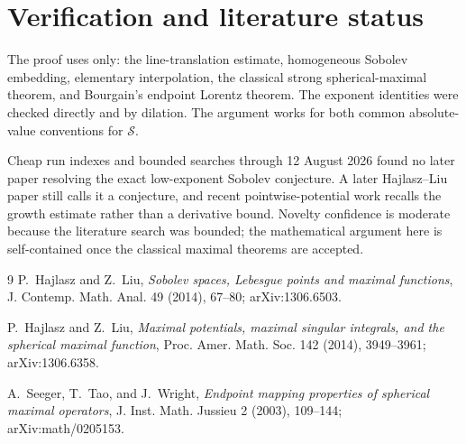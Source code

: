 \documentclass[11pt]{article}
\newcommand{\Sph}{\mathcal S}
\begin{document}
\section{Verification and literature status}

The proof uses only: the line-translation estimate, homogeneous Sobolev
embedding, elementary interpolation, the classical strong spherical-maximal
theorem, and Bourgain's endpoint Lorentz theorem.  The exponent identities
were checked directly and by dilation.  The argument works for both common
absolute-value conventions for $\Sph$.

Cheap run indexes and bounded searches through 12 August 2026 found no later
paper resolving the exact low-exponent Sobolev conjecture.  A later
Hajlasz--Liu paper still calls it a conjecture, and recent pointwise-potential
work recalls the growth estimate rather than a derivative bound.  Novelty
confidence is moderate because the literature search was bounded; the
mathematical argument here is self-contained once the classical maximal
theorems are accepted.

\begin{thebibliography}{9}
P.~Hajlasz and Z.~Liu,
\emph{Sobolev spaces, Lebesgue points and maximal functions},
J. Contemp. Math. Anal. 49 (2014), 67--80; arXiv:1306.6503.

P.~Hajlasz and Z.~Liu,
\emph{Maximal potentials, maximal singular integrals, and the spherical
maximal function}, Proc. Amer. Math. Soc. 142 (2014), 3949--3961;
arXiv:1306.6358.

A.~Seeger, T.~Tao, and J.~Wright,
\emph{Endpoint mapping properties of spherical maximal operators},
J. Inst. Math. Jussieu 2 (2003), 109--144; arXiv:math/0205153.
\end{thebibliography}
\end{document}

